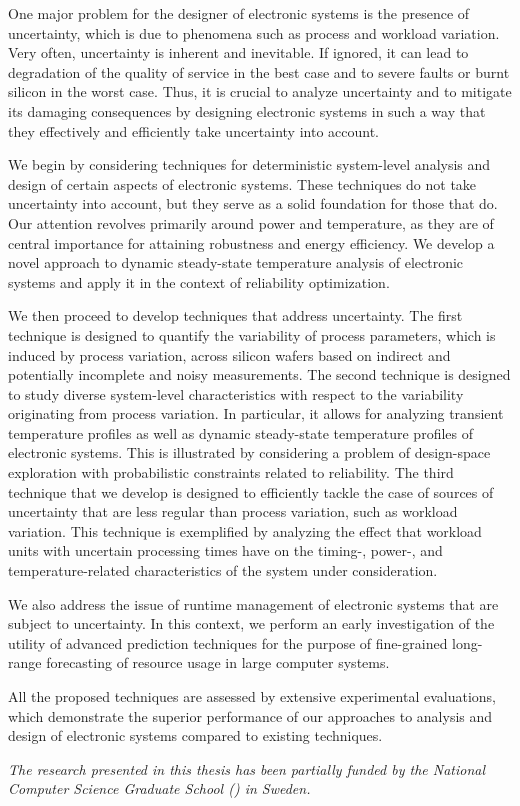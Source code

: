 One major problem for the designer of electronic systems is the presence of
uncertainty, which is due to phenomena such as process and workload variation.
Very often, uncertainty is inherent and inevitable. If ignored, it can lead to
degradation of the quality of service in the best case and to severe faults or
burnt silicon in the worst case. Thus, it is crucial to analyze uncertainty and
to mitigate its damaging consequences by designing electronic systems in such a
way that they effectively and efficiently take uncertainty into account.

We begin by considering techniques for deterministic system-level analysis and
design of certain aspects of electronic systems. These techniques do not take
uncertainty into account, but they serve as a solid foundation for those that
do. Our attention revolves primarily around power and temperature, as they are
of central importance for attaining robustness and energy efficiency. We develop
a novel approach to dynamic steady-state temperature analysis of electronic
systems and apply it in the context of reliability optimization.

We then proceed to develop techniques that address uncertainty. The first
technique is designed to quantify the variability of process parameters, which
is induced by process variation, across silicon wafers based on indirect and
potentially incomplete and noisy measurements. The second technique is designed
to study diverse system-level characteristics with respect to the variability
originating from process variation. In particular, it allows for analyzing
transient temperature profiles as well as dynamic steady-state temperature
profiles of electronic systems. This is illustrated by considering a problem of
design-space exploration with probabilistic constraints related to reliability.
The third technique that we develop is designed to efficiently tackle the case
of sources of uncertainty that are less regular than process variation, such as
workload variation. This technique is exemplified by analyzing the effect that
workload units with uncertain processing times have on the timing-, power-, and
temperature-related characteristics of the system under consideration.

We also address the issue of runtime management of electronic systems that are
subject to uncertainty. In this context, we perform an early investigation of
the utility of advanced prediction techniques for the purpose of fine-grained
long-range forecasting of resource usage in large computer systems.

All the proposed techniques are assessed by extensive experimental evaluations,
which demonstrate the superior performance of our approaches to analysis and
design of electronic systems compared to existing techniques.

\vspace{1em}
\noindent
\emph{
  The research presented in this thesis has been partially funded by the
  National Computer Science Graduate School () in Sweden.
}
